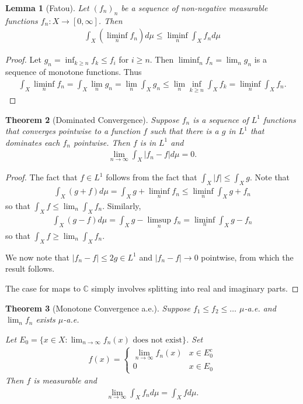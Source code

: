\documentclass[11pt]{amsart}
\newtheorem{theorem}{Theorem}[section]
\newtheorem{lemma}[theorem]{Lemma}
\theoremstyle{definition}
\numberwithin{equation}{section}
\begin{document}
\begin{lemma}[Fatou]
    Let $(f_n)_n$ be a sequence of non-negative measurable functions $f_n:X\to[0,\infty]$. Then
    \begin{align*}
        \int_X(\liminf_nf_n)d\mu\le\liminf_n\int_Xf_nd\mu
    \end{align*}
\end{lemma}
\begin{proof}
    Let $g_n=\inf_{k\ge n}f_k\le f_i$ for $i\ge n$. Then $\liminf _nf_n=\lim_ng_n$ is a sequence of monotone functions. Thus
    \begin{align*}
        \int_X\liminf_nf_n=\int_X\lim_ng_n=\lim_n\int_Xg_n\le\lim_n\inf_{k\ge n}\int_Xf_k=\liminf_n\int_Xf_n.
    \end{align*}
\end{proof}
\begin{theorem}[Dominated Convergence]
    Suppose $f_n$ is a sequence of $L^1$ functions that converges pointwise to a function $f$ such that there is a $g$ in $L^1$ that dominates each $f_n$ pointwise. Then $f$ is in $L^1$ and
    \begin{align*}
        \lim_{n\to\infty}\int_X|f_n-f|d\mu=0.
    \end{align*}
\end{theorem}
\begin{proof}
    The fact that $f\in L^1$ follows from the fact that $\int_X|f|\le\int_Xg$. Note that 
    \begin{align*}
        \int_X(g+f)d\mu=\int_Xg+\liminf_nf_n\le\liminf_n\int_Xg+f_n
    \end{align*}
    so that $\int_Xf\le\lim_n\int_Xf_n$. Similarly,
    \begin{align*}
        \int_X(g-f)d\mu=\int_Xg-\limsup_nf_n=\liminf_n\int_Xg-f_n
    \end{align*}
    so that $\int_Xf\ge\lim_n\int_Xf_n$.

    We now note that $|f_n-f|\le 2g\in L^1$ and $|f_n-f|\to0$ pointwise, from which the result follows.

    The case for maps to $\mathbb C$ simply involves splitting into real and imaginary parts.
\end{proof}
\begin{theorem}[Monotone Convergence a.e.]
    Suppose $f_1\le f_2\le \ldots$ $\mu$-a.e. and $\lim_nf_n$ exists $\mu$-a.e.

    Let $E_0=\{x\in X:\lim_{n\to\infty}f_n(x)\text{ does not exist}\}$. Set 
    \begin{align*}
        f(x)=\begin{cases}
            \lim_{n\to\infty}f_n(x)&x \in E_0^c\\
            0 & x\in E_0
        \end{cases}
    \end{align*}
    Then $f$ is measurable and
    \begin{align*}
        \lim_{n\to\infty}\int_Xf_nd\mu=\int_Xfd\mu.
    \end{align*}
\end{theorem}
\end{document}

